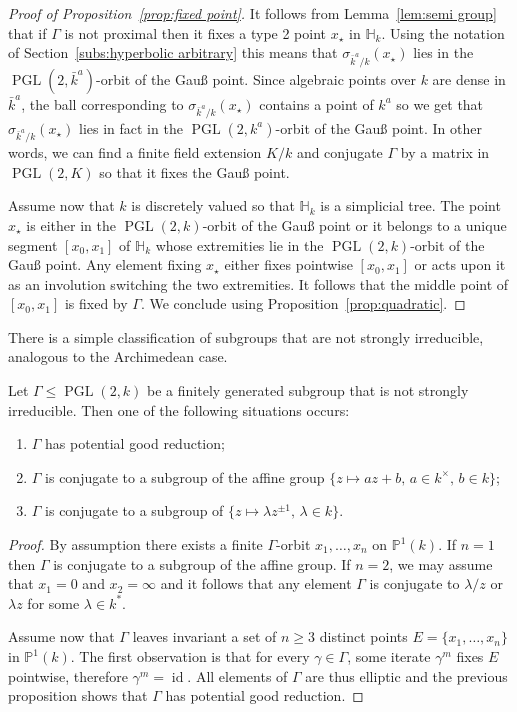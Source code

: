 \documentclass[AHL,Unicode,longabstracts]{cedram}
\DeclareMathOperator{\id}{id}
\DeclareMathOperator{\PGL}{PGL}
\newcommand{\pp}{\mathbb{P}}
\newcommand{\hh}{\mathbb{H}}
\newcommand{\PGLk}{\PGL(2, k)}
\begin{document}
\begin{proof}[Proof of Proposition~\ref{prop:fixed point}]
It follows from Lemma~\ref{lem:semi group} that if $\Gamma$ is not proximal then it fixes a type 2 point $x_\star$ in $\hh_k$. Using the notation of Section~\ref{subs:hyperbolic arbitrary} this means that $\sigma_{\bar{k}^a/k}(x_\star)$ lies in the $\PGL(2,\bar{k}^a)$-orbit of the Gau\ss{} point. Since algebraic points over $k$ are dense in $\bar{k}^a$, the ball corresponding to $\sigma_{\bar{k}^a/k}(x_\star)$ contains a point of $k^a$ so we get that $\sigma_{\bar{k}^a/k}(x_\star)$ lies in fact in the $\PGL(2,k^a)$-orbit of the Gau\ss{} point. In other words, we can find a finite field extension $K/k$ and conjugate $\Gamma$ by a matrix in $\PGL(2,K)$ so that it fixes the Gau\ss{} point.

Assume now that $k$ is discretely valued so that $\hh_k$ is a simplicial tree. The point $x_\star$ is either in the $\PGL(2,k)$-orbit of the Gau\ss{} point or it belongs to a unique segment $[x_0,x_1]$ of $\hh_k$ whose extremities lie in the $\PGL(2,k)$-orbit of the Gau\ss{} point. Any element fixing $x_\star$ either fixes pointwise $[x_0,x_1]$ or acts upon it as an involution switching the two extremities. It follows that the middle point of $[x_0,x_1]$ is fixed by $\Gamma$. We conclude using Proposition~\ref{prop:quadratic}.
\end{proof}


There is a simple classification of subgroups that are not strongly irreducible, analogous to the Archimedean case.

\begin{prop}\label{prop:strongly irreducible}
Let $\Gamma\leq \PGLk$ be a finitely generated subgroup that is not strongly irreducible. Then one of the following situations occurs:
\begin{enumerate}
\item $\Gamma$ has potential good reduction;
\item $\Gamma$ is conjugate to a subgroup of the affine group $\{z\mapsto a z + b, \, a \in k^\times, \, b\in k\}$;
\item $\Gamma$ is conjugate to a subgroup of $\{z\mapsto \lambda z^{\pm 1},\, \lambda \in k\}$.
\end{enumerate}
\end{prop}

\begin{proof}
By assumption there exists a finite $\Gamma$-orbit $x_1, \ldots, x_n$ on $\pp^1(k)$. If $n=1$ then $\Gamma$ is conjugate to a subgroup of the affine group. If $n=2$, we may assume that $x_1 =0$ and $x_2 =\infty$ and it follows that any element $\Gamma$ is conjugate to $\lambda /z$ or $\lambda z$ for some $\lambda\in k^*$.

Assume now that $\Gamma$ leaves invariant a set of $n\ge3$ distinct points $E= \{ x_1, \ldots, x_n \}$ in $\pp^1(k)$. The first observation is that for every $\gamma\in \Gamma$, some iterate $\gamma^m$ fixes $E$ pointwise, therefore $\gamma^m = \id$. All elements of $\Gamma$ are thus elliptic and the previous proposition shows that $\Gamma$ has potential good reduction.
\end{proof}
\end{document}
